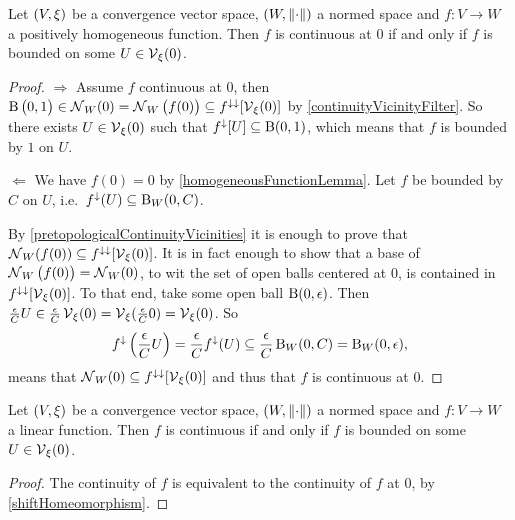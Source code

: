 \begin{proposition} \label{continuityToNormedSpace}
Let $\left( V, \xi \right)$ be a convergence vector space, $\left( W, \lVert\cdot\rVert \right)$ a normed space and $f: V\to W$ a positively homogeneous function. Then $f$ is continuous at $0$ \textup{if and only if} $f$ is bounded on some $U\in \operatorname{\mathcal{V}}_\xi(0)$.
\end{proposition}
\begin{proof}
$\boxed{\Rightarrow}$ Assume $f$ continuous at $0$, then $\operatorname{B}\big(0,1\big)\in \operatorname{\mathcal{N}}_W(0) = \operatorname{\mathcal{N}}_W\big(f(0)\big) \subseteq f^{\downarrow\downarrow}[\operatorname{\mathcal{V}}_\xi(0)]$ by \ref{continuityVicinityFilter}. So there exists $U\in \operatorname{\mathcal{V}}_\xi(0)$ such that $f^{\downarrow}[U] \subseteq \operatorname{B}(0,1)$, which means that $f$ is bounded by $1$ on $U$.

$\boxed{\Leftarrow}$ We have $f(0) = 0$ by \ref{homogeneousFunctionLemma}. Let $f$ be bounded by $C$ on $U$, i.e.\ $f^{\downarrow}(U)\subseteq \operatorname{B}_W(0,C)$. 

By \ref{pretopologicalContinuityVicinities} it is enough to prove that $\operatorname{\mathcal{N}}_W(f(0)) \subseteq f^{\downarrow\downarrow}[\operatorname{\mathcal{V}}_\xi(0)]$. It is in fact enough to show that a base of $\operatorname{\mathcal{N}}_W\big(f(0)\big) = \operatorname{\mathcal{N}}_W(0)$, to wit the set of open balls centered at $0$, is contained in $f^{\downarrow\downarrow}[\operatorname{\mathcal{V}}_\xi(0)]$. To that end, take some open ball $\operatorname{B}(0,\epsilon)$. Then $\frac{\epsilon}{C} U\in \frac{\epsilon}{C}\operatorname{\mathcal{V}}_\xi(0) = \operatorname{\mathcal{V}}_\xi(\frac{\epsilon}{C}0) = \operatorname{\mathcal{V}}_\xi(0)$. So
\[ f^{\downarrow}\left(\frac{\epsilon}{C}U\right) = \frac{\epsilon}{C}f^{\downarrow}(U)\subseteq \frac{\epsilon}{C}\operatorname{B}_W(0,C) = \operatorname{B}_W(0,\epsilon), \]
means that $\operatorname{\mathcal{N}}_W(0) \subseteq f^{\downarrow\downarrow}[\operatorname{\mathcal{V}}_\xi(0)]$ and thus that $f$ is continuous at $0$.
\end{proof}
\begin{corollary} \label{linearContinuityToNormedSpace}
Let $\left( V, \xi \right)$ be a convergence vector space, $\left( W, \lVert\cdot\rVert \right)$ a normed space and $f: V\to W$ a linear function. Then $f$ is continuous \textup{if and only if} $f$ is bounded on some $U\in \operatorname{\mathcal{V}}_\xi(0)$.
\end{corollary}
\begin{proof}
The continuity of $f$ is equivalent to the continuity of $f$ at $0$, by \ref{shiftHomeomorphism}.
\end{proof}

